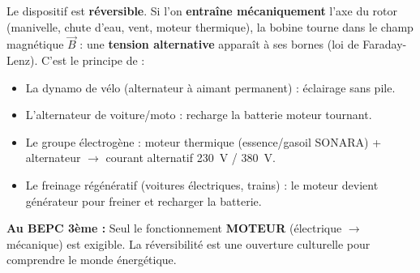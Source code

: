 \documentclass[11pt]{article}
\newcommand{\cle}[1]{{\popxbold\color{popdark}#1}}
\begin{document}
\begin{savaistu}
Le dispositif est \textbf{réversible}. Si l'on \textbf{entraîne mécaniquement} l'axe du rotor (manivelle, chute d'eau, vent, moteur thermique), la bobine tourne dans le champ magnétique $\vec{B}$ : une \textbf{tension alternative} apparaît à ses bornes (loi de Faraday-Lenz). C'est le principe de :
\begin{itemize}
\item La \cle{dynamo} de vélo (alternateur à aimant permanent) : éclairage sans pile.
\item L'\cle{alternateur} de voiture/moto : recharge la batterie moteur tournant.
\item Le \cle{groupe électrogène} : moteur thermique (essence/gasoil SONARA) + alternateur $\rightarrow$ courant alternatif \SI{230}{V} / \SI{380}{V}.
\item Le \cle{freinage régénératif} (voitures électriques, trains) : le moteur devient générateur pour freiner et recharger la batterie.
\end{itemize}
\textbf{Au BEPC 3ème :} Seul le fonctionnement \textbf{MOTEUR} (électrique $\rightarrow$ mécanique) est exigible. La réversibilité est une ouverture culturelle pour comprendre le monde énergétique.
\end{savaistu}
\end{document}
